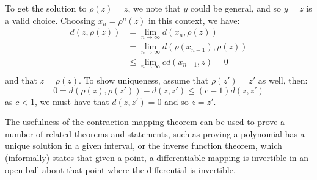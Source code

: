 \begin{bproof}{}{}
To get the solution to $\rho(z) = z$, we note that $y$ could be general, and so $y=z$ is a valid choice. Choosing \mbox{$x_{n} = \rho^{n}(z)$} in this context, we have:
\begin{equation}
\begin{split}
    d(z,\rho(z)) &= \lim_{n\to \infty} d(x_{n}, \rho(z)) \\
     &= \lim_{n\to \infty} d(\rho(x_{n-1}), \rho(z)) \\
     &\leq \lim_{n\to \infty} c d(x_{n-1}, z) = 0 \\
\end{split}
\end{equation}
and that $z = \rho(z)$. To show uniqueness, assume that $\rho(z') = z'$ as well, then:
\begin{equation}
    0 = d(\rho(z), \rho(z') ) - d(z,z') \leq (c - 1) d(z,z')
\end{equation}
as $c<1$, we must have that $d(z,z')=0$ and so $z=z'$.
\eop
\end{bproof}

The usefulness of the contraction mapping theorem can be used to prove a number of related theorems and statements, such as proving a polynomial has a unique solution in a given interval, or the inverse function theorem, which (informally) states that given a point, a differentiable mapping is invertible in an open ball about that point where the differential is invertible.